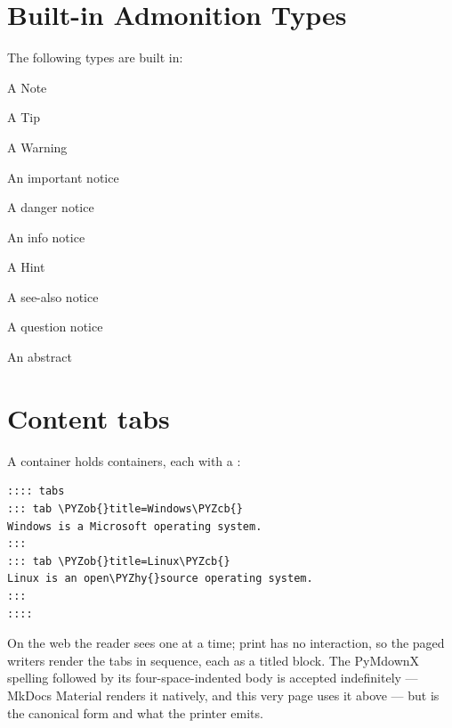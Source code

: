 \documentclass[a4paper,twoside]{article}
\begin{document}
\section{Built-in Admonition Types}
The following types are built in:
\begin{tscallout}[kind=note]
A Note
\end{tscallout}
\begin{tscallout}[kind=tip]
A Tip
\end{tscallout}
\begin{tscallout}[kind=warning]
A Warning
\end{tscallout}
\begin{tscallout}[kind=important]
An important notice
\end{tscallout}
\begin{tscallout}[kind=danger]
A danger notice
\end{tscallout}
\begin{tscallout}[kind=info]
An info notice
\end{tscallout}
\begin{tscallout}[kind=hint]
A Hint
\end{tscallout}
\begin{tscallout}[kind=seealso]
A see-also notice
\end{tscallout}
\begin{tscallout}[kind=question]
A question notice
\end{tscallout}
\begin{tscallout}[kind=abstract]
An abstract
\end{tscallout}
\section{Content tabs}
A  container holds  containers, each with a :
\begin{tscode}[lang=md, engine=pygments]
\begin{Verbatim}[commandchars=\\\{\},breaklines, breakanywhere, commandchars=\\\{\}]
:::: tabs
::: tab \PYZob{}title=Windows\PYZcb{}
Windows is a Microsoft operating system.
:::
::: tab \PYZob{}title=Linux\PYZcb{}
Linux is an open\PYZhy{}source operating system.
:::
::::
\end{Verbatim}
\end{tscode}
On the web the reader sees one at a time; print has no interaction, so the
paged writers render the tabs in sequence, each as a titled block. The
PyMdownX spelling  followed by its four-space-indented body is
accepted indefinitely --- MkDocs Material renders it natively, and this very page
uses it above --- but \tscodeinline{:::} is the canonical form and what the printer emits.
\end{document}
